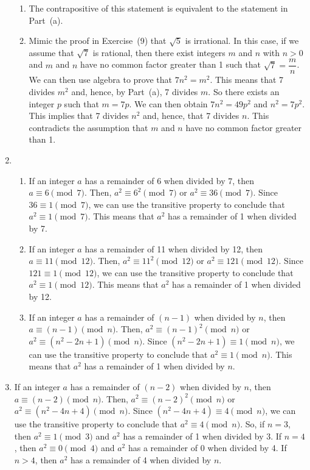\begin{enumerate}
\begin{enumerate}
\item The contrapositive of this statement is equivalent to the statement in Part~(a).

\item Mimic the proof in Exercise~(9) that $\sqrt{5}$ is irrational.  In this case, if we assume that $\sqrt{7}$ is rational, then there exist integers $m$ and $n$ with $n > 0$ and $m$ and $n$ have no common factor greater than 1 such that $\sqrt{7} = \dfrac{m}{n}$.  We can then use algebra to prove that $7n^2 = m^2$.  This means that 7 divides $m^2$ and, hence, by Part~(a), 7 divides $m$.  So there exists an integer $p$ such that $m = 7p$.  We can then obtain 
$7n^2 = 49p^2$ and $n^2 = 7p^2$.  This implies that 7 divides $n^2$ and, hence, that 7 divides 
$n$.  This contradicts the assumption that $m$ and $n$ have no common factor greater than 1.
\end{enumerate}


\item \begin{enumerate}
\item If an integer $a$ has a remainder of 6 when divided by 7, then $a \equiv 6 \pmod 7$.  Then, $a^2 \equiv 6^2 \pmod 7$ or $a^2 \equiv 36 \pmod 7$.  Since $36 \equiv 1 \pmod 7$, we can use the transitive property to conclude that $a^2 \equiv 1 \pmod 7$.  This means that $a^2$ has a remainder of 1 when divided by 7.

\item If an integer $a$ has a remainder of 11 when divided by 12, then $a \equiv 11 \pmod 12$.  Then, $a^2 \equiv 11^2 \pmod 12$ or $a^2 \equiv 121 \pmod 12$.  Since $121 \equiv 1 \pmod 12$, we can use the transitive property to conclude that $a^2 \equiv 1 \pmod 12$.  This means that 
$a^2$ has a remainder of 1 when divided by 12.

\item If an integer $a$ has a remainder of $(n - 1)$ when divided by $n$, then 
$a \equiv (n - 1) \pmod n$.  Then, $a^2 \equiv (n - 1)^2 \pmod n$ or 
$a^2 \equiv (n^2 - 2n + 1) \pmod n$.  Since $(n^2 - 2n + 1) \equiv 1 \pmod n$, we can use the transitive property to conclude that $a^2 \equiv 1 \pmod n$.  This means that $a^2$ has a remainder of 1 when divided by $n$.
\end{enumerate}


\item If an integer $a$ has a remainder of $(n - 2)$ when divided by $n$, then 
$a \equiv (n - 2) \pmod n$.  Then, $a^2 \equiv (n - 2)^2 \pmod n$ or 
$a^2 \equiv (n^2 - 4n + 4) \pmod n$.  Since $(n^2 - 4n + 4) \equiv 4 \pmod n$, we can use the transitive property to conclude that $a^2 \equiv 4 \pmod n$.  So, if $n = 3$, then 
$a^2 \equiv 1 \pmod 3$ and $a^2$ has a remainder of 1 when divided by 3.  If $n = 4$, then 
$a^2 \equiv 0 \pmod 4$ and $a^2$ has a remainder of 0 when divided by 4.  If $n > 4$, then $a^2$ has a remainder of 4 when divided by $n$.



\end{enumerate}
